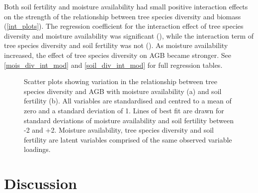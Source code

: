 \documentclass[11pt,a4paper]{article}
\begin{document}
Both soil fertility and moisture availability had small positive interaction effects on the strength of the relationship between tree species diversity and biomass (\autoref{int_plots}). The regression coefficient for the interaction effect of tree species diversity and moisture availability was significant (\moderp{}), while the interaction term of tree species diversity and soil fertility was not (\moders{}). As moisture availability increased, the effect of tree species diversity on AGB became stronger. See \autoref{mois_div_int_mod} and \autoref{soil_div_int_mod} for full regression tables.


\begin{figure}[H]
\centering
	\caption{Scatter plots showing variation in the relationship between tree species diversity and AGB with moisture availability (a) and soil fertility (b). All variables are standardised and centred to a mean of zero and a standard deviation of 1. Lines of best fit are drawn for standard deviations of moisture availability and soil fertility between -2 and +2. Moisture availability, tree species diversity and soil fertility are latent variables comprised of the same observed variable loadings.}
	\label{int_plots}
\end{figure}

\section{Discussion}

\end{document}

